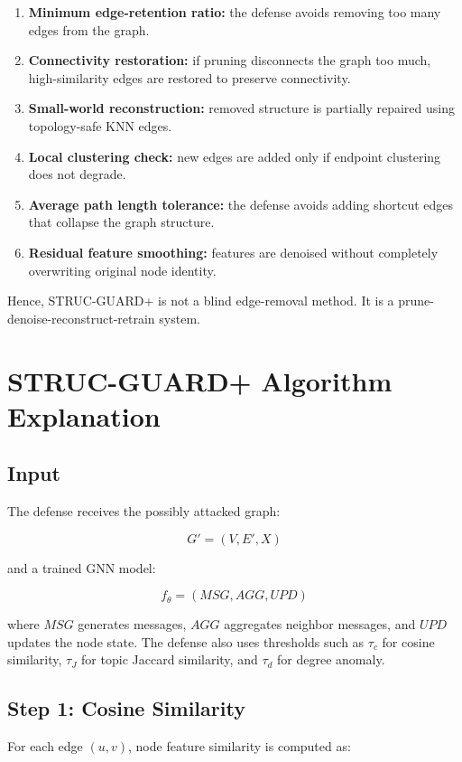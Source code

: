 \documentclass[12pt,a4paper]{article}
\begin{document}
\begin{enumerate}
    \item \textbf{Minimum edge-retention ratio:} the defense avoids removing too many edges from the graph.
    \item \textbf{Connectivity restoration:} if pruning disconnects the graph too much, high-similarity edges are restored to preserve connectivity.
    \item \textbf{Small-world reconstruction:} removed structure is partially repaired using topology-safe KNN edges.
    \item \textbf{Local clustering check:} new edges are added only if endpoint clustering does not degrade.
    \item \textbf{Average path length tolerance:} the defense avoids adding shortcut edges that collapse the graph structure.
    \item \textbf{Residual feature smoothing:} features are denoised without completely overwriting original node identity.
\end{enumerate}

Hence, STRUC-GUARD+ is not a blind edge-removal method. It is a prune-denoise-reconstruct-retrain system.

\section{STRUC-GUARD+ Algorithm Explanation}

\subsection{Input}
The defense receives the possibly attacked graph:

$$
G'=(V,E',X)
$$

and a trained GNN model:

$$
f_{\theta}=(MSG,AGG,UPD)
$$

where $MSG$ generates messages, $AGG$ aggregates neighbor messages, and $UPD$ updates the node state. The defense also uses thresholds such as $\tau_c$ for cosine similarity, $\tau_J$ for topic Jaccard similarity, and $\tau_d$ for degree anomaly.

\subsection{Step 1: Cosine Similarity}
For each edge $(u,v)$, node feature similarity is computed as:
\end{document}
